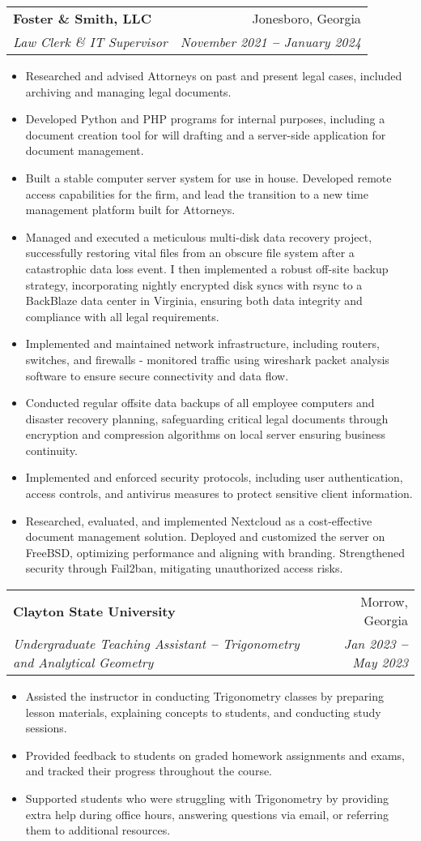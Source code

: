 \documentclass[letterpaper,11pt]{article}
\makeatletter
\newcommand{\resumeItem}[1]{
  \item\small{
    {#1 \vspace{-2pt}}
  }
}
\newcommand{\resumeSubheading}[4]{
  \vspace{-2pt}\item
    \begin{tabular*}{0.97\textwidth}[t]{l@{\extracolsep{\fill}}r}
      \textbf{#1} & #2 \\
      \textit{\small#3} & \textit{\small #4} \\
    \end{tabular*}\vspace{-7pt}
}
\newcommand{\resumeItemListStart}{\begin{itemize}}
\newcommand{\resumeItemListEnd}{\end{itemize}\vspace{-5pt}}
\makeatother
\begin{document}
    \resumeSubheading
      {Foster \& Smith, LLC}{Jonesboro, Georgia}
      {Law Clerk \& IT Supervisor}{November 2021 \textbf{--} January 2024}
        \resumeItemListStart
            \resumeItem{Researched and advised Attorneys on past and present legal cases, included archiving and managing legal documents.}
            \resumeItem{Developed Python and PHP programs for internal purposes, including a document creation tool for will drafting and a server-side application for document management.}
            \resumeItem{Built a stable computer server system for use in house. Developed remote access capabilities for the firm, and lead the transition to a new time management platform built for Attorneys.}
            \resumeItem{Managed and executed a meticulous multi-disk data recovery project, successfully restoring vital files from an obscure file system after a catastrophic data loss event. I then implemented a robust off-site backup strategy, incorporating nightly encrypted disk syncs with rsync to a BackBlaze data center in Virginia, ensuring both data integrity and compliance with all legal requirements.}
            \resumeItem{Implemented and maintained network infrastructure, including routers, switches, and firewalls - monitored traffic using wireshark packet analysis software to ensure secure connectivity and data flow.}
            \resumeItem{Conducted regular offsite data backups of all employee computers and disaster recovery planning, safeguarding critical legal documents through encryption and compression algorithms on local server ensuring business continuity.}
            \resumeItem{Implemented and enforced security protocols, including user authentication, access controls, and antivirus measures to protect sensitive client information.}
            \resumeItem{Researched, evaluated, and implemented Nextcloud as a cost-effective document management solution. Deployed and customized the server on FreeBSD, optimizing performance and aligning with branding. Strengthened security through Fail2ban, mitigating unauthorized access risks.}
        \resumeItemListEnd
    
    \resumeSubheading
      {Clayton State University}{Morrow, Georgia}
      {Undergraduate Teaching Assistant \textbf{--} Trigonometry and Analytical Geometry}{Jan 2023 \textbf{--} May 2023}
        \resumeItemListStart
            \resumeItem{Assisted the instructor in conducting Trigonometry classes by preparing lesson materials, explaining concepts to students, and conducting study sessions.}
            \resumeItem{Provided feedback to students on graded homework assignments and exams, and tracked their progress throughout the course.}
            \resumeItem{Supported students who were struggling with Trigonometry by providing extra help during office hours, answering questions via email, or referring them to additional resources.}
        \resumeItemListEnd
    
\end{document}
